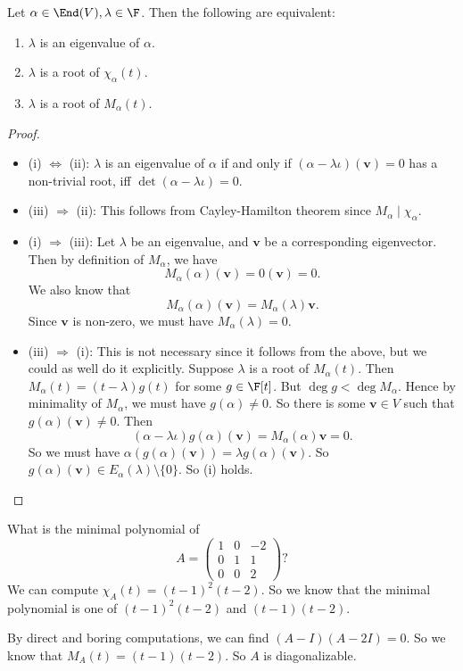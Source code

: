 \documentclass[a4paper]{article}
\begin{document}
\begin{lemma}
  Let $\alpha \in \End(V), \lambda \in \F$. Then the following are equivalent:
  \begin{enumerate}
    \item $\lambda$ is an eigenvalue of $\alpha$.
    \item $\lambda$ is a root of $\chi_\alpha(t)$.
    \item $\lambda$ is a root of $M_\alpha(t)$.
  \end{enumerate}
\end{lemma}

\begin{proof}\leavevmode
  \begin{itemize}
    \item (i) $\Leftrightarrow$ (ii): $\lambda$ is an eigenvalue of $\alpha$ if and only if $(\alpha - \lambda \iota)(\mathbf{v}) = 0$ has a non-trivial root, iff $\det(\alpha - \lambda \iota) = 0$.
    \item (iii) $\Rightarrow$ (ii): This follows from Cayley-Hamilton theorem since $M_\alpha \mid \chi_\alpha$.
    \item (i) $\Rightarrow$ (iii): Let $\lambda$ be an eigenvalue, and $\mathbf{v}$ be a corresponding eigenvector. Then by definition of $M_\alpha$, we have
      \[
        M_\alpha(\alpha)(\mathbf{v}) = 0(\mathbf{v}) = 0.
      \]
      We also know that
      \[
        M_\alpha(\alpha)(\mathbf{v}) = M_\alpha(\lambda)\mathbf{v}.
      \]
      Since $\mathbf{v}$ is non-zero, we must have $M_\alpha(\lambda) =0$.

    \item (iii) $\Rightarrow$ (i): This is not necessary since it follows from the above, but we could as well do it explicitly. Suppose $\lambda$ is a root of $M_\alpha(t)$. Then $M_\alpha(t) = (t - \lambda) g(t)$ for some $g \in \F[t]$. But $\deg g < \deg M_\alpha$. Hence by minimality of $M_\alpha$, we must have $g(\alpha) \not= 0$. So there is some $\mathbf{v}\in V$ such that $g(\alpha)(\mathbf{v}) \not=0$. Then
      \[
        (\alpha - \lambda\iota)g(\alpha)(\mathbf{v}) = M_\alpha(\alpha)\mathbf{v} = 0.
      \]
      So we must have $\alpha (g(\alpha)(\mathbf{v})) = \lambda g(\alpha)(\mathbf{v})$. So $g(\alpha)(\mathbf{v}) \in E_\alpha(\lambda) \setminus \{0\}$. So (i) holds.
  \end{itemize}
\end{proof}

\begin{eg}
  What is the minimal polynomial of
  \[
    A =
    \begin{pmatrix}
      1 & 0 & -2\\
      0 & 1 & 1\\
      0 & 0 & 2
    \end{pmatrix}?
  \]
  We can compute $\chi_A(t) = (t - 1)^2 (t - 2)$. So we know that the minimal polynomial is one of $(t - 1)^2(t - 2)$ and $(t - 1)(t - 2)$.

  By direct and boring computations, we can find $(A - I)(A - 2I) = 0$. So we know that $M_A(t) = (t - 1)(t - 2)$. So $A$ is diagonalizable.
\end{eg}
\end{document}
